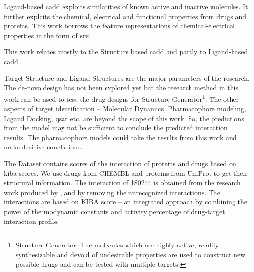  
Ligand-based \acrshort{cadd} exploits similarities of known active and inactive molecules. It further exploits the chemical, electrical and functional properties from drugs and proteins. This work borrows the feature representations of chemical-electrical properties in the form of \acrfull{srv}.


This work relates mostly to the Structure based \acrshort{cadd} and partly to Ligand-based \acrshort{cadd}. 
\iffalse
The parameters of our work can be associated with \begin{itemize}
    \setlength\parindent{24pt}
    \item Target Structure %
    \item Ligand Structure %
\end{itemize}
\fi
Target Structure and Ligand Structures are the major parameters of the research. The de-novo design has not been explored yet but the research method in this work can be used to test the drug designs for Structure Generator\footnote{Structure Generator: The molecules which are highly active, readily synthesizable and devoid of undesirable properties are used to construct new possible drugs and can be tested with multiple targets.}. The other aspects of target identification -- Molecular Dynamics, Pharmacophore modeling, Ligand Docking, \acrfull{qsar} etc. are beyond the scope of this work. So, the predictions from the model may not be sufficient to conclude the predicted interaction results. The pharmacophore models could take the results from this work and make decisive conclusions. 

\iffalse
(52498, 254)
180244
\fi
The Dataset contains scores of the interaction of proteins and drugs based on \acrshort{kiba} scores. We use  drugs from CHEMBL and  proteins from UniProt to get their structural information. The interaction of 180244 is obtained from the research work produced by \citep{Tang2013}, and by removing the unrecognized interactions. The interactions are based on KIBA score -- an integrated approach by combining the power of thermodynamic constants and activity percentage of drug-target interaction profile.

